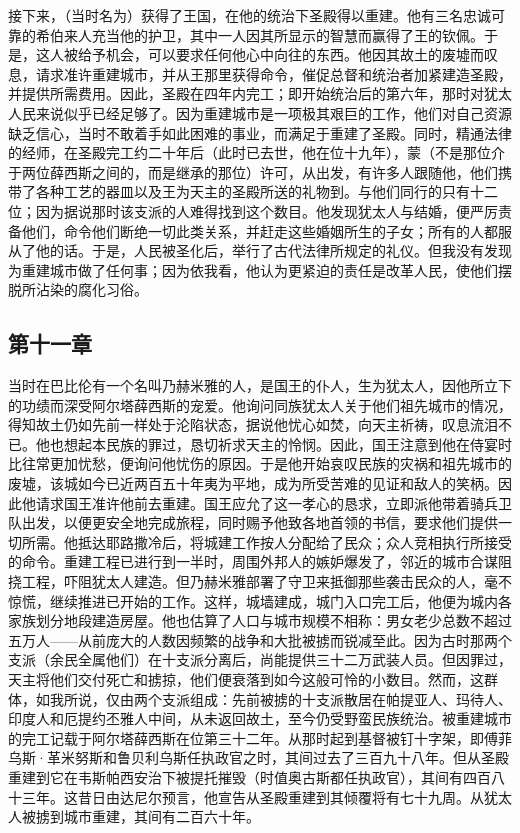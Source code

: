 接下来，（当时名为）获得了王国，在他的统治下圣殿得以重建。他有三名忠诚可靠的希伯来人充当他的护卫，其中一人因其所显示的智慧而赢得了王的钦佩。于是，这人被给予机会，可以要求任何他心中向往的东西。他因其故土的废墟而叹息，请求准许重建城市，并从王那里获得命令，催促总督和统治者加紧建造圣殿，并提供所需费用。因此，圣殿在四年内完工；即开始统治后的第六年，那时对犹太人民来说似乎已经足够了。因为重建城市是一项极其艰巨的工作，他们对自己资源缺乏信心，当时不敢着手如此困难的事业，而满足于重建了圣殿。同时，精通法律的经师，在圣殿完工约二十年后（此时已去世，他在位十九年），蒙（不是那位介于两位薛西斯之间的，而是继承的那位）许可，从出发，有许多人跟随他，他们携带了各种工艺的器皿以及王为天主的圣殿所送的礼物到。与他们同行的只有十二位；因为据说那时该支派的人难得找到这个数目。他发现犹太人与结婚，便严厉责备他们，命令他们断绝一切此类关系，并赶走这些婚姻所生的子女；所有的人都服从了他的话。于是，人民被圣化后，举行了古代法律所规定的礼仪。但我没有发现为重建城市做了任何事；因为依我看，他认为更紧迫的责任是改革人民，使他们摆脱所沾染的腐化习俗。\par


\subsection{第十一章}

当时在巴比伦有一个名叫乃赫米雅的人，是国王的仆人，生为犹太人，因他所立下的功绩而深受阿尔塔薛西斯的宠爱。他询问同族犹太人关于他们祖先城市的情况，得知故土仍如先前一样处于沦陷状态，据说他忧心如焚，向天主祈祷，叹息流泪不已。他也想起本民族的罪过，恳切祈求天主的怜悯。因此，国王注意到他在侍宴时比往常更加忧愁，便询问他忧伤的原因。于是他开始哀叹民族的灾祸和祖先城市的废墟，该城如今已近两百五十年夷为平地，成为所受苦难的见证和敌人的笑柄。因此他请求国王准许他前去重建。国王应允了这一孝心的恳求，立即派他带着骑兵卫队出发，以便更安全地完成旅程，同时赐予他致各地首领的书信，要求他们提供一切所需。他抵达耶路撒冷后，将城建工作按人分配给了民众；众人竞相执行所接受的命令。重建工程已进行到一半时，周围外邦人的嫉妒爆发了，邻近的城市合谋阻挠工程，吓阻犹太人建造。但乃赫米雅部署了守卫来抵御那些袭击民众的人，毫不惊慌，继续推进已开始的工作。这样，城墙建成，城门入口完工后，他便为城内各家族划分地段建造房屋。他也估算了人口与城市规模不相称：男女老少总数不超过五万人——从前庞大的人数因频繁的战争和大批被掳而锐减至此。因为古时那两个支派（余民全属他们）在十支派分离后，尚能提供三十二万武装人员。但因罪过，天主将他们交付死亡和掳掠，他们便衰落到如今这般可怜的小数目。然而，这群体，如我所说，仅由两个支派组成：先前被掳的十支派散居在帕提亚人、玛待人、印度人和厄提约丕雅人中间，从未返回故土，至今仍受野蛮民族统治。被重建城市的完工记载于阿尔塔薛西斯在位第三十二年。从那时起到基督被钉十字架，即傅菲乌斯·革米努斯和鲁贝利乌斯任执政官之时，其间过去了三百九十八年。但从圣殿重建到它在韦斯帕西安治下被提托摧毁（时值奥古斯都任执政官），其间有四百八十三年。这昔日由达尼尔预言，他宣告从圣殿重建到其倾覆将有七十九周。从犹太人被掳到城市重建，其间有二百六十年。\par

